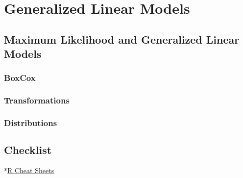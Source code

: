 \documentclass[
]{book}
\begin{document}
\hypertarget{generalized-linear-models}{%
\chapter{Generalized Linear Models}\label{generalized-linear-models}}

\hypertarget{maximum-likelihood-and-generalized-linear-models}{%
\section{Maximum Likelihood and Generalized Linear Models}\label{maximum-likelihood-and-generalized-linear-models}}

\hypertarget{boxcox-1}{%
\subsection{BoxCox}\label{boxcox-1}}

\hypertarget{transformations}{%
\subsection{Transformations}\label{transformations}}

\hypertarget{distributions-1}{%
\subsection{Distributions}\label{distributions-1}}

\hypertarget{checklist}{%
\section{Checklist}\label{checklist}}

*\href{https://www.rstudio.com/resources/cheatsheets/}{R Cheat Sheets}

  
\end{document}
